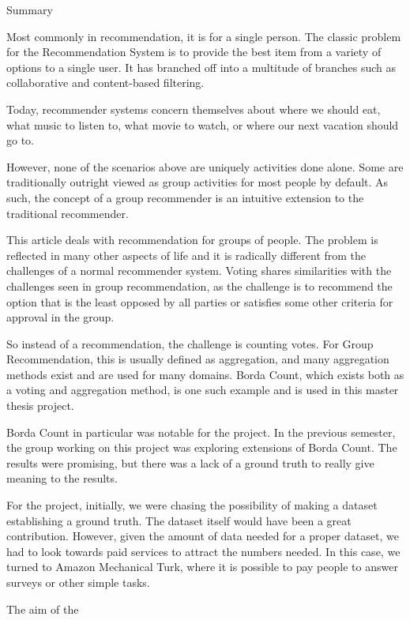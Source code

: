 \begin{titlepage}
\begin{adjustwidth*}{1.9cm}{1.9cm}
\Huge
\begin{center}
Summary
\end{center}
\vspace{.6cm}
\normalsize
Most commonly in recommendation, it is for a single person. The classic problem for the Recommendation System is to provide the best item from a variety of options to a single user. It has branched off into a multitude of branches such as collaborative and content-based filtering.

Today, recommender systems concern themselves about where we should eat, what music to listen to, what movie to watch, or where our next vacation should go to.

However, none of the scenarios above are uniquely activities done alone. Some are traditionally outright viewed as group activities for most people by default. As such, the concept of a group recommender is an intuitive extension to the traditional recommender.

This article deals with recommendation for groups of people. The problem is reflected in many other aspects of life and it is radically different from the challenges of a normal recommender system. Voting shares similarities with the challenges seen in group recommendation, as the challenge is to recommend the option that is the least opposed by all parties or satisfies some other criteria for approval in the group.

So instead of a recommendation, the challenge is counting votes. For Group Recommendation, this is usually defined as aggregation, and many aggregation methods exist and are used for many domains. Borda Count, which exists both as a voting and aggregation method, is one such example and is used in this master thesis project.

Borda Count in particular was notable for the project. In the previous semester, the group working on this project was exploring extensions of Borda Count. The results were promising, but there was a lack of a ground truth to really give meaning to the results.

For the project, initially, we were chasing the possibility of making a dataset establishing a ground truth. The dataset itself would have been a great contribution. However, given the amount of data needed for a proper dataset, we had to look towards paid services to attract the numbers needed. In this case, we turned to Amazon Mechanical Turk, where it is possible to pay people to answer surveys or other simple tasks.

The aim of the
\end{adjustwidth*}
\end{titlepage}